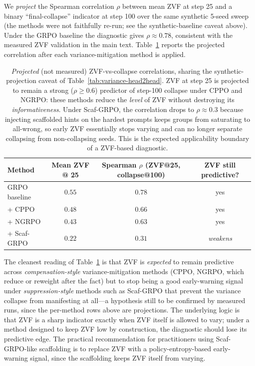 We \emph{project} the Spearman correlation \(\rho\) between mean
ZVF at step 25 and a binary ``final-collapse'' indicator at step 100
over the same synthetic 5-seed sweep (the methods were not faithfully
re-run; see the synthetic-baseline caveat above). Under the GRPO baseline the
diagnostic gives \(\rho \approx 0.78\), consistent with the measured ZVF
validation in the main text.
Table~\ref{tab:variance-zvf-rho} reports the projected correlation after
each variance-mitigation method is applied.

\begin{table}[t]
  \centering
  \small
  \setlength{\tabcolsep}{5pt}
  \begin{tabular}{lccc}
    \toprule
    \textbf{Method} &
    \textbf{Mean ZVF @ 25} &
    \textbf{Spearman $\rho$ (ZVF@25, collapse@100)} &
    \textbf{ZVF still predictive?} \\
    \midrule
    GRPO baseline & $0.55$ & $0.78$ & yes \\
    + CPPO        & $0.48$ & $0.66$ & yes \\
    + NGRPO       & $0.43$ & $0.63$ & yes \\
    + Scaf-GRPO   & $0.22$ & $0.31$ & \emph{weakens} \\
    \bottomrule
  \end{tabular}
  \caption{\emph{Projected} (not measured) ZVF-vs-collapse correlations,
  sharing the synthetic-projection caveat of Table~\ref{tab:variance-head2head}.
  ZVF at step 25 is projected to remain a strong ($\rho\ge 0.6$) predictor
  of step-100 collapse under CPPO and NGRPO: these methods
  reduce the \emph{level} of ZVF without destroying its
  \emph{informativeness}. Under Scaf-GRPO, the correlation drops to
  $\rho\approx 0.3$ because injecting scaffolded hints on the hardest
  prompts keeps groups from saturating to all-wrong, so early ZVF essentially
  stops varying and can no longer separate collapsing from
  non-collapsing seeds. This is the expected applicability boundary
  of a ZVF-based diagnostic.}
  \label{tab:variance-zvf-rho}
\end{table}

The cleanest reading of Table~\ref{tab:variance-zvf-rho} is that ZVF is
\emph{expected} to remain predictive across \emph{compensation-style}
variance-mitigation methods (CPPO, NGRPO, which reduce or reweight after the
fact) but to stop being a good early-warning signal under
\emph{suppression-style} methods such as Scaf-GRPO that prevent the
variance collapse from manifesting at all---a hypothesis still to be confirmed
by measured runs, since the per-method rows above are projections. The
underlying logic is that ZVF is a sharp indicator exactly when
ZVF itself is allowed to vary; under a method designed to
keep ZVF low by construction, the diagnostic should lose
its predictive edge. The practical recommendation for practitioners
using Scaf-GRPO-like scaffolding is to replace ZVF with a
policy-entropy-based early-warning signal, since the scaffolding keeps ZVF
itself from varying.

